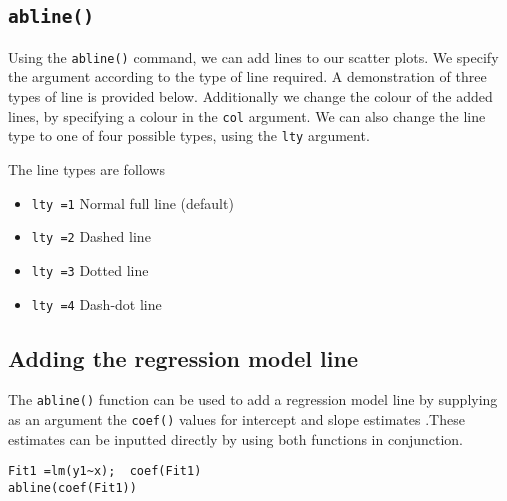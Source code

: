 \documentclass[a4paper,12pt]{article}
\begin{document}
\subsection*{\texttt{abline()}}

Using the \texttt{abline()} command, we can add lines to our scatter plots. We specify the argument according to the type of line required. A demonstration of three types of line is provided below.
Additionally we change the colour of the added lines, by specifying a colour in the \texttt{col} argument. We can also change the line type to one of four possible types, using the \texttt{lty} argument.


The line types are follows
\begin{itemize}
	\item	\texttt{lty =1}   Normal full line (default)
	\item	\texttt{lty =2}   Dashed line
	\item	\texttt{lty =3}   Dotted line
	\item	\texttt{lty =4}   Dash-dot line
\end{itemize}
\footnotesize 






\subsection{Adding the regression model line}

The \texttt{abline()} function can be used to add a regression model line  by supplying as an argument the \texttt{coef()} values for intercept and slope estimates .These estimates can be inputted directly by using both functions in conjunction.

\footnotesize \begin{verbatim}
Fit1 =lm(y1~x);  coef(Fit1)
abline(coef(Fit1))	
\end{verbatim}
\end{document}
